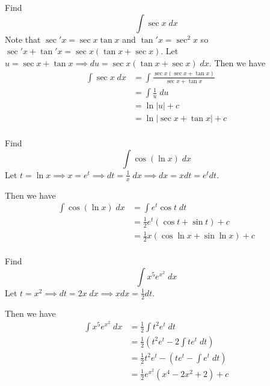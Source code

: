 \documentclass{article}
\begin{document}
  \begin{example}
    Find \[
      \int \sec x \; dx
    \]
    Note that $\sec' x = \sec x \tan x$ and $\tan' x = \sec^2 x$ so $\sec' x + \tan' x = \sec x(\tan x + \sec x)$.
    Let $u = \sec x + \tan x \implies du = \sec x(\tan x + \sec x) \; dx$. Then we have
    \begin{align*}
      \int \sec x \; dx &= \int \frac{\sec x(\sec x + \tan x)}{\sec x + \tan x}\\
      &= \int \frac{1}{u} \; du\\
      &= \ln |u| + c\\
      &= \ln |\sec x + \tan x| + c\\
    \end{align*}
  \end{example}
  \begin{example}
    Find \[
      \int \cos (\ln x) \; dx
    \]
    Let $t = \ln x \implies x = e^t \implies dt = \frac{1}{x} \; dx \implies dx = xdt =e^tdt$.

    Then we have
    \begin{align*}
      \int \cos (\ln x) \; dx &= \int e^t\cos t \; dt\\
      &=\frac{1}{2}e^t(\cos t + \sin t) + c\\
      &= \frac{1}{2} x(\cos \ln x + \sin \ln x) + c\\
    \end{align*}
  \end{example}
  \begin{example}
    Find \[
      \int x^5 e^{x^2}\; dx
    \]
    Let $t=x^2 \implies dt = 2x \; dx \implies xdx = \frac{1}{2}dt$.

    Then we have
    \begin{align*}
      \int x^5 e^{x^2}\; dx &= \frac{1}{2}\int t^2 e^t \; dt\\
      &= \frac{1}{2}\left(t^2e^t - 2\int te^t \; dt\right) \tag{Integration by parts}\\
      &= \frac{1}{2}t^2e^t - \left(te^t - \int e^t \; dt\right)\\
      &= \frac{1}{2}e^{x^2}(x^4 - 2x^2 + 2) + c\\
    \end{align*}
  \end{example}
\end{document}
